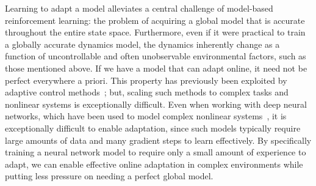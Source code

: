 Learning to adapt a model alleviates a central challenge of model-based reinforcement learning: the problem of acquiring a global model that is accurate throughout the entire state space. Furthermore, even if it were practical to train a globally accurate dynamics model, the dynamics inherently change as a function of uncontrollable and often unobservable environmental factors, such as those mentioned above. If we have a model that can adapt online, it need not be perfect everywhere a priori. This property has previously been exploited by adaptive control methods~\citep{aastrom2013adaptive,sastry1989adaptive, pastor2011online, franzi2016robustonline}; but, scaling such methods to complex tasks and nonlinear systems is exceptionally difficult. Even when working with deep neural networks, which have been used to model complex nonlinear systems~\citep{thanard}, it is exceptionally difficult to enable adaptation, since such models typically require large amounts of data and many gradient steps to learn effectively. By specifically training a neural network model to require only a small amount of experience to adapt, we can enable effective online adaptation in complex environments while putting less pressure on needing a perfect global model. 


